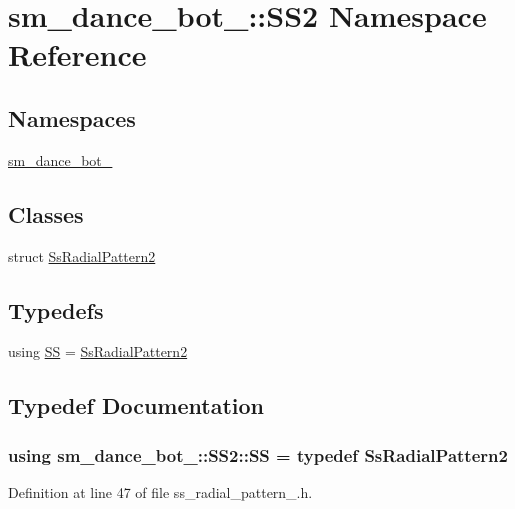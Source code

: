 \hypertarget{namespacesm__dance__bot__3_1_1SS2}{}\section{sm\+\_\+dance\+\_\+bot\+\_\+:\+:S\+S2 Namespace Reference}
\label{namespacesm__dance__bot__3_1_1SS2}
\subsection*{Namespaces}
\begin{DoxyCompactItemize}
\item 
 \hyperlink{namespacesm__dance__bot__3_1_1SS2_1_1sm__dance__bot__3}{sm\+\_\+dance\+\_\+bot\+\_}
\end{DoxyCompactItemize}
\subsection*{Classes}
\begin{DoxyCompactItemize}
\item 
struct \hyperlink{structsm__dance__bot__3_1_1SS2_1_1SsRadialPattern2}{Ss\+Radial\+Pattern2}
\end{DoxyCompactItemize}
\subsection*{Typedefs}
\begin{DoxyCompactItemize}
\item 
using \hyperlink{namespacesm__dance__bot__3_1_1SS2_ae79ad46f5855381231ed20957cbfedfb}{SS} = \hyperlink{structsm__dance__bot__3_1_1SS2_1_1SsRadialPattern2}{Ss\+Radial\+Pattern2}
\end{DoxyCompactItemize}


\subsection{Typedef Documentation}
\subsubsection[{\texorpdfstring{SS}{SS}}]{\setlength{\rightskip}{0pt plus 5cm}using {\bf sm\+\_\+dance\+\_\+bot\+\_\+::\+S\+S2\+::\+SS} = typedef {\bf Ss\+Radial\+Pattern2}}\hypertarget{namespacesm__dance__bot__3_1_1SS2_ae79ad46f5855381231ed20957cbfedfb}{}\label{namespacesm__dance__bot__3_1_1SS2_ae79ad46f5855381231ed20957cbfedfb}


Definition at line 47 of file ss\+\_\+radial\+\_\+pattern\+\_.\+h.


